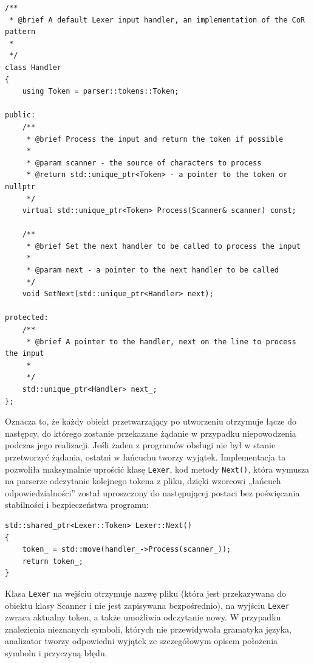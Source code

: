 \begin{lstlisting}[label=list:handler,caption=Klasa Handler,basicstyle=\footnotesize\ttfamily]
/**
 * @brief A default Lexer input handler, an implementation of the CoR pattern
 * 
 */
class Handler
{
    using Token = parser::tokens::Token;
    
public:
    /**
     * @brief Process the input and return the token if possible
     * 
     * @param scanner - the source of characters to process
     * @return std::unique_ptr<Token> - a pointer to the token or nullptr 
     */
    virtual std::unique_ptr<Token> Process(Scanner& scanner) const;
    
    /**
     * @brief Set the next handler to be called to process the input
     * 
     * @param next - a pointer to the next handler to be called
     */
    void SetNext(std::unique_ptr<Handler> next);
    
protected:
    /**
     * @brief A pointer to the handler, next on the line to process the input
     * 
     */
    std::unique_ptr<Handler> next_;
};
\end{lstlisting}

Oznacza to, że każdy obiekt przetwarzający po utworzeniu otrzymuje łącze do następcy, do którego zostanie przekazane żądanie w przypadku niepowodzenia podczas jego realizacji. Jeśli żaden z programów obsługi nie był w stanie przetworzyć żądania, ostatni w łańcuchu tworzy wyjątek. Implementacja ta pozwoliła maksymalnie uprościć klasę \texttt{Lexer}, kod metody \texttt{Next()}, która wymusza na parserze odczytanie kolejnego tokena z pliku, dzięki wzorcowi „łańcuch odpowiedzialności” \cite{cor} został uproszczony do następującej postaci bez poświęcania stabilności i bezpieczeństwa programu:

\begin{lstlisting}[label=list:scanner,caption=Metoda Lexer::Next(),basicstyle=\footnotesize\ttfamily]
std::shared_ptr<Lexer::Token> Lexer::Next()
{
    token_ = std::move(handler_->Process(scanner_));
    return token_;
}
\end{lstlisting}

Klasa \texttt{Lexer} na wejściu otrzymuje nazwę pliku (która jest przekazywana do obiektu klasy Scanner i nie jest zapisywana bezpośrednio), na wyjściu \texttt{Lexer} zwraca aktualny token, a także umożliwia odczytanie nowy. W przypadku znalezienia nieznanych symboli, których nie przewidywała gramatyka języka, analizator tworzy odpowiedni wyjątek ze szczegółowym opisem położenia symbolu i przyczyną błędu.

